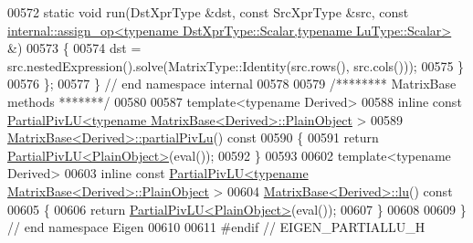 \begin{DoxyCode}
00572   \textcolor{keyword}{static} \textcolor{keywordtype}{void} run(DstXprType &dst, \textcolor{keyword}{const} SrcXprType &src, \textcolor{keyword}{const} 
      \hyperlink{struct_eigen_1_1internal_1_1assign__op}{internal::assign\_op<typename DstXprType::Scalar,typename LuType::Scalar>}
       &)
00573   \{
00574     dst = src.nestedExpression().solve(MatrixType::Identity(src.rows(), src.cols()));
00575   \}
00576 \};
00577 \} \textcolor{comment}{// end namespace internal}
00578 
00579 \textcolor{comment}{/******** MatrixBase methods *******/}
00580 
00587 \textcolor{keyword}{template}<\textcolor{keyword}{typename} Derived>
00588 \textcolor{keyword}{inline} \textcolor{keyword}{const} \hyperlink{group___l_u___module_class_eigen_1_1_partial_piv_l_u}{PartialPivLU<typename MatrixBase<Derived>::PlainObject}
      >
00589 \hyperlink{group___core___module_a6199d8aaf26c1b8ac3097fdfa7733a1e}{MatrixBase<Derived>::partialPivLu}()\textcolor{keyword}{ const}
00590 \textcolor{keyword}{}\{
00591   \textcolor{keywordflow}{return} \hyperlink{group___l_u___module_class_eigen_1_1_partial_piv_l_u}{PartialPivLU<PlainObject>}(eval());
00592 \}
00593 
00602 \textcolor{keyword}{template}<\textcolor{keyword}{typename} Derived>
00603 \textcolor{keyword}{inline} \textcolor{keyword}{const} \hyperlink{group___l_u___module_class_eigen_1_1_partial_piv_l_u}{PartialPivLU<typename MatrixBase<Derived>::PlainObject}
      >
00604 \hyperlink{group___core___module_afb312afbfe960cbda67811552d876fae}{MatrixBase<Derived>::lu}()\textcolor{keyword}{ const}
00605 \textcolor{keyword}{}\{
00606   \textcolor{keywordflow}{return} \hyperlink{group___l_u___module_class_eigen_1_1_partial_piv_l_u}{PartialPivLU<PlainObject>}(eval());
00607 \}
00608 
00609 \} \textcolor{comment}{// end namespace Eigen}
00610 
00611 \textcolor{preprocessor}{#endif // EIGEN\_PARTIALLU\_H}
\end{DoxyCode}
